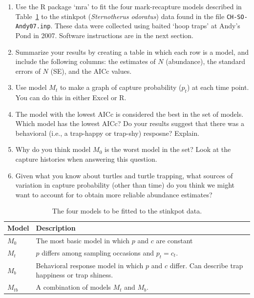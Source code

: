 \documentclass[12pt]{article}\usepackage[]{graphicx}\usepackage[]{color}
\begin{document}
\begin{enumerate}
  \item Use the R package `mra' to fit the four
    mark-recapture models described in Table~\ref{tab:Otis} to the
    stinkpot ({\it Sternotherus odoratus}) data found in the file
    \verb+CH-SO-Andy07.inp+. These data were collected using baited
    `hoop traps' at Andy's Pond in 2007. Software instructions are in
    the next section. 
  \item Summarize your results by creating a table in which each row
    is a model, and include the following columns: the estimates of $N$
    (abundance), the standard errors of $N$ (SE), and the AICc
    values.
  \item Use model $M_t$ to make a graph of capture probability ($p_t$)
    at each time point. You can do this in either Excel or R.
  \item The model with the lowest AICc is considered the best in
    the set of models. Which model has the lowest AICc? Do your
    results suggest that %
    there was a behavioral (i.e., a trap-happy or
    trap-shy) resposne? Explain.
  \item Why do you think model $M_0$ is the worst model
    in the set? Look at the capture histories when answering this
    question. 
  \item Given what you know about turtles and turtle trapping,
    what sources of variation in capture probability (other than time)
    do you think we might want to account for to obtain more reliable
    abundance estimates?
\end{enumerate}

\clearpage

\begin{table}[h!]
  \centering
  \caption{The four models to be fitted to the stinkpot data.}
  \begin{tabular}[h!]{lp{5in}}
    \hline
    Model & Description \\
    \hline
    $M_0$ & The most basic model in which $p$ and $c$ are constant \\
    $M_t$ & $p$ differs among sampling occasions and $p_t=c_t$. \\
    $M_b$ & Behavioral response model in which $p$ and $c$
            differ. Can describe trap happiness or trap shiness. \\
    $M_{tb}$ & A combination of models $M_t$ and $M_b$. \\
    \hline
  \end{tabular}
  \label{tab:Otis}
\end{table}
\end{document}
